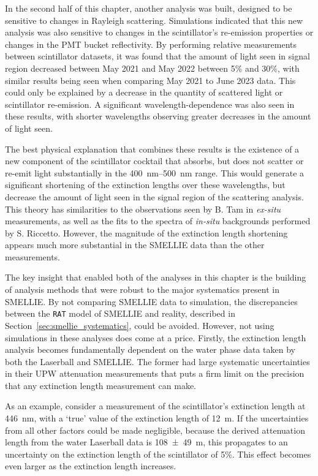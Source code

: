 In the second half of this chapter, another analysis was built, designed to be sensitive to changes in Rayleigh scattering. Simulations indicated that this new analysis was also sensitive to changes in the scintillator's  re-emission properties or changes in the PMT bucket reflectivity. By performing relative measurements between scintillator datasets, it was found that the amount of light seen in signal region decreased between May 2021 and May 2022 between 5\% and 30\%, with similar results being seen when comparing May 2021 to June 2023 data. This could only be explained by a decrease in the quantity of scattered light or scintillator re-emission. A significant wavelength-dependence was also seen in these results, with shorter wavelengths observing greater decreases in the amount of light seen.

The best physical explanation that combines these results is the existence of a new component of the scintillator cocktail that absorbs, but does not scatter or re-emit light substantially in the \SIrange{400}{500}{\nm} range. This would generate a significant shortening of the extinction lengths over these wavelengths, but decrease the amount of light seen in the signal region of the scattering analysis. This theory has similarities to the observations seen by B. Tam in \textit{ex-situ} measurements, as well as the fits to the spectra of \textit{in-situ} backgrounds performed by S. Riccetto. However, the magnitude of the extinction length shortening appears much more substantial in the SMELLIE data than the other measurements.

The key insight that enabled both of the analyses in this chapter is the building of analysis methods that were robust to the major systematics present in SMELLIE. By not comparing SMELLIE data to simulation, the discrepancies between the \texttt{RAT} model of SMELLIE and reality, described in Section~\ref{sec:smellie_systematics}, could be avoided. However, not using simulations in these analyses does come at a price. Firstly, the extinction length analysis becomes fundamentally dependent on the water phase data taken by both the Laserball and SMELLIE. The former had large systematic uncertainties in their UPW attenuation measurements that puts a firm limit on the precision that any extinction length measurement can make.

As an example, consider a measurement of the scintillator's extinction length at \SI{446}{\nm}, with a `true' value of the extinction length of \SI{12}{\m}. If the uncertainties from all other factors could be made negligible, because the derived attenuation length from the water Laserball data is \SI{108(49)}{\m}, this propagates to an uncertainty on the extinction length of the scintillator of 5\%. This effect becomes even larger as the extinction length increases.

